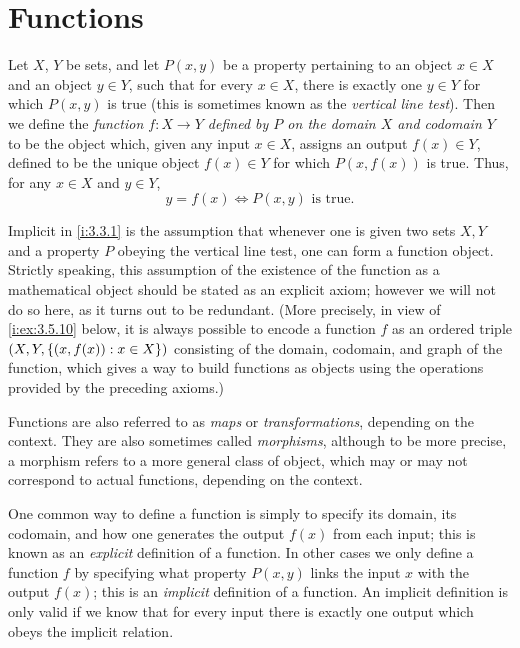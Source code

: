 \section{Functions}\label{i:sec:3.3}

\begin{defn}[Functions]\label{i:3.3.1}
  Let \(X\), \(Y\) be sets, and let \(P(x, y)\) be a property pertaining to an object \(x \in X\) and an object \(y \in Y\), such that for every \(x \in X\), there is exactly one \(y \in Y\) for which \(P(x, y)\) is true (this is sometimes known as the \emph{vertical line test}).
  Then we define the \emph{function \(f : X \to Y\) defined by \(P\) on the domain \(X\) and codomain \(Y\)} to be the object which, given any input \(x \in X\), assigns an output \(f(x) \in Y\), defined to be the unique object \(f(x) \in Y\) for which \(P(x, f(x))\) is true.
  Thus, for any \(x \in X\) and \(y \in Y\),
  \[
    y = f(x) \iff P(x, y) \text{ is true}.
  \]
\end{defn}

\begin{note}
  Implicit in \cref{i:3.3.1} is the assumption that whenever one is given two sets \(X, Y\) and a property \(P\) obeying the vertical line test, one can form a function object.
  Strictly speaking, this assumption of the existence of the function as a mathematical object should be stated as an explicit axiom;
  however we will not do so here, as it turns out to be redundant.
  (More precisely, in view of \cref{i:ex:3.5.10} below, it is always possible to encode a function \(f\) as an ordered triple \((X, Y, \left\lbrace(x, f(x)) : x \in X\right\rbrace)\) consisting of the domain, codomain, and graph of the function, which gives a way to build functions as objects using the operations provided by the preceding axioms.)
\end{note}

\begin{note}
  Functions are also referred to as \emph{maps} or \emph{transformations}, depending on the context.
  They are also sometimes called \emph{morphisms}, although to be more precise, a morphism refers to a more general class of object, which may or may not correspond to actual functions, depending on the context.
\end{note}

\begin{note}
  One common way to define a function is simply to specify its domain, its codomain, and how one generates the output \(f(x)\) from each input;
  this is known as an \emph{explicit} definition of a function.
  In other cases we only define a function \(f\) by specifying what property \(P(x, y)\) links the input \(x\) with the output \(f(x)\);
  this is an \emph{implicit} definition of a function.
  An implicit definition is only valid if we know that for every input there is exactly one output which obeys the implicit relation.
\end{note}


